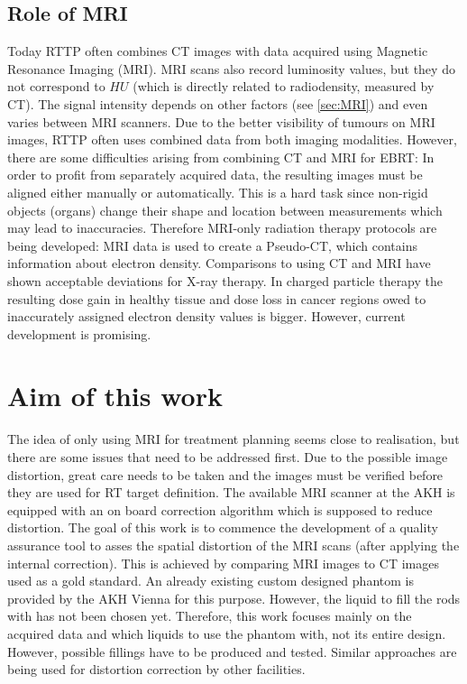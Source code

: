 \subsection{Role of MRI}
Today RTTP often combines CT images with data acquired using Magnetic Resonance Imaging (MRI).
MRI scans also record luminosity values, but they do not correspond to $HU$ (which is directly related to radiodensity, measured by CT).
The signal intensity depends on other factors (see \ref{sec:MRI}) and even varies between MRI scanners.
Due to the better visibility of tumours on MRI images, RTTP often uses combined data from both imaging modalities.
However, there are some difficulties arising from combining CT and MRI for EBRT:
In order to profit from separately acquired data, the resulting images must be aligned either manually or automatically. This is a hard task since non-rigid objects (organs) change their shape and location between measurements which may lead to inaccuracies.
Therefore MRI-only radiation therapy protocols are being developed:
MRI data is used to create a Pseudo-CT, which contains information about electron density. Comparisons to using CT and MRI have shown acceptable deviations for X-ray therapy.
In charged particle therapy the resulting dose gain in healthy tissue and dose loss in cancer regions owed to inaccurately assigned electron density values is bigger.
However, current development is promising. \cite{Rank2013, Stanescu2006, Nyholm2015, Greer2015, Chen2004}



\section{Aim of this work}
The idea of only using MRI for treatment planning seems close to realisation, but there are some issues that need to be addressed first.
Due to the possible image distortion, great care needs to be taken and the images must be verified before they are used for RT target definition.
The available MRI scanner at the AKH is equipped with an on board correction algorithm which is supposed to reduce distortion.
The goal of this work is to commence the development of a quality assurance tool to asses the spatial distortion of the MRI scans (after applying the internal correction).
This is achieved by comparing MRI images to CT images used as a gold standard.
An already existing custom designed phantom is provided by the AKH Vienna for this purpose.
However, the liquid to fill the rods with has not been chosen yet.
Therefore, this work focuses mainly on the acquired data and which liquids to use the phantom with, not its entire design.
However, possible fillings have to be produced and tested.
Similar approaches are being used for distortion correction by other facilities. \cite{Price2015, Petersch2004, Torfeh2015, Wang2004, Wang2004b, Mizowaki2000}

